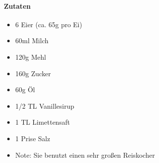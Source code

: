 \newpage
{}

\paragraph{Zutaten}
\begin{itemize}[noitemsep]
	\item 6 Eier (ca. 65g pro Ei)
	\item 60ml Milch
	\item 120g Mehl
	\item 160g Zucker
	\item 60g Öl 
	\item 1/2 TL Vanillesirup
	\item 1 TL Limettensaft 
	\item 1 Prise Salz
	\item Note: Sie benutzt einen sehr großen Reiskocher
\end{itemize}


